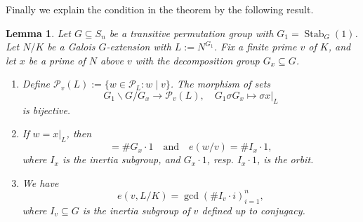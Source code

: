 \documentclass{amsart}
\numberwithin{equation}{section}
\theoremstyle{plain}
\newtheorem{lemma}[theorem]{Lemma}
\theoremstyle{definition}
\theoremstyle{remark}
\begin{document}
Finally we explain the condition in the theorem by the following result.
\begin{lemma}\label{lemma: ramification of primes in general}
    Let $G\subseteq S_n$ be a transitive permutation group with $G_1=\operatorname{Stab}_G(1)$.
    Let $N/K$ be a Galois $G$-extension with $L:=N^{G_1}$.
    Fix a finite prime $v$ of $K$, and let $x$ be a prime of $N$ above $v$ with the decomposition group $G_{x}\subseteq G$.
	\begin{enumerate}
		\item Define $\mathcal{P}_{v}(L):=\{w\in\mathcal{P}_L:w\mid v\}$.
		The morphism of sets
		\begin{equation*}
			G_1\backslash G/G_{x}\to\mathcal{P}_{v}(L),\quad G_1\sigma G_{x}\mapsto\sigma x\vert_L
		\end{equation*}
		is bijective.
		\item If $w=x\vert_L$, then
		\begin{equation*}
			[L_{w}:K_{v}]=\# G_{x}\cdot1
			\quad\text{and}\quad
			e(w/v)=\# I_{x}\cdot1,
		\end{equation*}
		where $I_{x}$ is the inertia subgroup, and $G_{x}\cdot1$, resp. $I_{x}\cdot1$, is the orbit.
		\item We have
		\begin{equation*}
			e(v,L/K)=\gcd(\# I_{v}\cdot i)_{i=1}^n,
		\end{equation*}
		where $I_{v}\subseteq G$ is the inertia subgroup of $v$ defined up to conjugacy.
	\end{enumerate}
\end{lemma}
\end{document}
